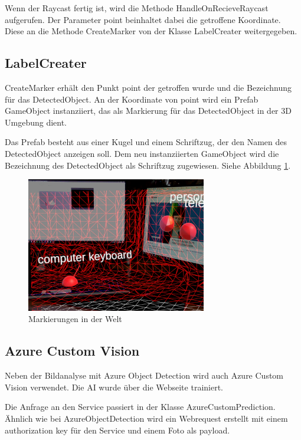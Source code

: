 \documentclass[german,a4paper, 12pt]{llncs}
\begin{document}
Wenn der Raycast fertig ist, wird die Methode HandleOnRecieveRaycast aufgerufen. Der Parameter point beinhaltet dabei die getroffene Koordinate.
Diese an die Methode CreateMarker von der Klasse LabelCreater weitergegeben.

\subsection{LabelCreater}

CreateMarker erhält den Punkt point der getroffen wurde und die Bezeichnung für das DetectedObject. An der Koordinate von point wird ein Prefab GameObject instanziiert, das als Markierung für das DetectedObject in der 3D Umgebung dient.

Das Prefab besteht aus einer Kugel und einem Schriftzug, der den Namen des DetectedObject anzeigen soll. Dem neu instanziierten GameObject wird die Bezeichnung des DetectedObject als Schriftzug zugewiesen. Siehe Abbildung \ref{image:labels}.

\begin{figure}[H]
	\centering
	\includegraphics[width=0.7\textwidth]{images/ML_labels.jpg}
	\caption[]{Markierungen in der Welt}
	\label{image:labels}
\end{figure}

\subsection{Azure Custom Vision}

Neben der Bildanalyse mit Azure Object Detection wird auch Azure Custom Vision verwendet.
Die AI wurde über die Webseite trainiert.

Die Anfrage an den Service passiert in der Klasse AzureCustomPrediction. Ähnlich wie bei AzureObjectDetection wird ein Webrequest erstellt mit einem authorization key für den Service und einem Foto als payload.
\end{document}
